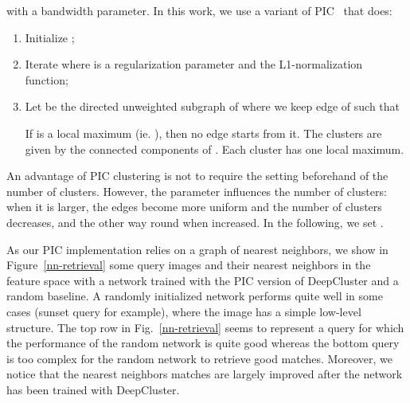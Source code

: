 \documentclass[runningheads]{llncs}
\def\OURS{DeepCluster\xspace}
\begin{document}
with  a bandwidth parameter.
In this work, we use a variant of PIC~\cite{douze2017evaluation,CL12} that does: 
\begin{enumerate}
\item 
	Initialize ;
\item  
	Iterate 
	where  is a regularization parameter and  the L1-normalization function; 
\item 
	Let  be the directed unweighted subgraph of  where we keep edge  of  such that 
	 
	If  is a local maximum (ie. ), then no edge starts from it. 
	The clusters are given by the connected components of . 
	Each cluster has one local maximum. 
\end{enumerate}

An advantage of PIC clustering is not to require the setting beforehand of the number of clusters.
However, the parameter  influences the number of clusters: when it is larger, the edges become more uniform and the number of clusters decreases, and the other way round when  increased. 
In the following, we set .

As our PIC implementation relies on a graph of nearest neighbors, we show in Figure~\ref{nn-retrieval} some query images and their  nearest neighbors in the feature space with a network trained with the PIC version of DeepCluster and a random baseline.
A randomly initialized network performs quite well in some cases (sunset query for example), where the image has a simple low-level structure.
The top row in Fig.~\ref{nn-retrieval} seems to represent a query for which the performance of the random network is quite good whereas the bottom query is too complex for the random network to retrieve good matches.
Moreover, we notice that the nearest neighbors matches are largely improved after the network has been trained with \OURS.
\end{document}
